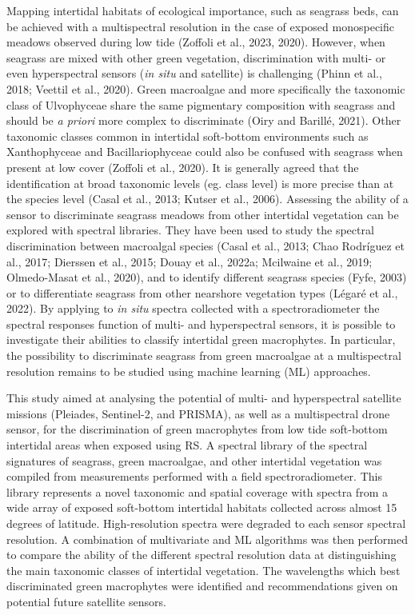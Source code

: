 \documentclass[
  letterpaper,
  11pt,
  english,
  singlespacing,
  headsepline]{MastersDoctoralThesis}
\begin{document}
\begin{spacing}{1.5}
Mapping intertidal habitats of ecological importance, such as seagrass
beds, can be achieved with a multispectral resolution in the case of
exposed monospecific meadows observed during low tide (Zoffoli et al.,
2023, 2020). However, when seagrass are mixed with other green
vegetation, discrimination with multi- or even hyperspectral sensors
(\emph{in situ} and satellite) is challenging (Phinn et al., 2018;
Veettil et al., 2020). Green macroalgae and more specifically the
taxonomic class of Ulvophyceae share the same pigmentary composition
with seagrass and should be \emph{a priori} more complex to discriminate
(Oiry and Barillé, 2021). Other taxonomic classes common in intertidal
soft-bottom environments such as Xanthophyceae and Bacillariophyceae
could also be confused with seagrass when present at low cover (Zoffoli
et al., 2020). It is generally agreed that the identification at broad
taxonomic levels (eg. class level) is more precise than at the species
level (Casal et al., 2013; Kutser et al., 2006). Assessing the ability
of a sensor to discriminate seagrass meadows from other intertidal
vegetation can be explored with spectral libraries. They have been used
to study the spectral discrimination between macroalgal species (Casal
et al., 2013; Chao Rodríguez et al., 2017; Dierssen et al., 2015; Douay
et al., 2022a; Mcilwaine et al., 2019; Olmedo-Masat et al., 2020), and
to identify different seagrass species (Fyfe, 2003) or to differentiate
seagrass from other nearshore vegetation types (Légaré et al., 2022). By
applying to \emph{in situ} spectra collected with a spectroradiometer
the spectral responses function of multi- and hyperspectral sensors, it
is possible to investigate their abilities to classify intertidal green
macrophytes. In particular, the possibility to discriminate seagrass
from green macroalgae at a multispectral resolution remains to be
studied using machine learning (ML) approaches.

This study aimed at analysing the potential of multi- and hyperspectral
satellite missions (Pleiades, Sentinel-2, and PRISMA), as well as a
multispectral drone sensor, for the discrimination of green macrophytes
from low tide soft-bottom intertidal areas when exposed using RS. A
spectral library of the spectral signatures of seagrass, green
macroalgae, and other intertidal vegetation was compiled from
measurements performed with a field spectroradiometer. This library
represents a novel taxonomic and spatial coverage with spectra from a
wide array of exposed soft-bottom intertidal habitats collected across
almost 15 degrees of latitude. High-resolution spectra were degraded to
each sensor spectral resolution. A combination of multivariate and ML
algorithms was then performed to compare the ability of the different
spectral resolution data at distinguishing the main taxonomic classes of
intertidal vegetation. The wavelengths which best discriminated green
macrophytes were identified and recommendations given on potential
future satellite sensors.


\end{spacing}
\end{document}
